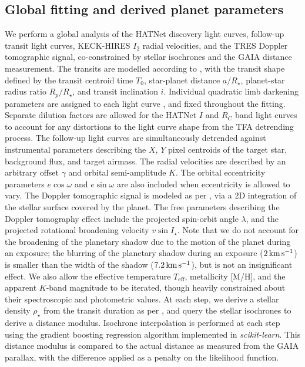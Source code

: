 \documentclass[apjl]{emulateapj}
\newcommand{\kms}{\ensuremath{\rm km\,s^{-1}}}
\begin{document}
\subsection{Global fitting and derived planet parameters}
\label{sec:global-fit}

We perform a global analysis of the HATNet discovery light curves, follow-up transit light curves, KECK-HIRES $I_2$ radial velocities, and the TRES Doppler tomographic signal, co-constrained by stellar isochrones and the GAIA distance measurement. The transits are modelled according to \citet{2002ApJ...580L.171M}, with the transit shape defined by the transit centroid time $T_0$, star-planet distance $a/R_\star$, planet-star radius ratio $R_p/R_\star$, and transit inclination $i$. Individual quadratic limb darkening parameters are assigned to each light curve \citep[interpolated from][]{Claret:2011}, and fixed throughout the fitting. Separate dilution factors are allowed for the HATNet $I$ and $R_C$ band light curves to account for any distortions to the light curve shape from the TFA detrending process. The follow-up light curves are simultaneously detrended against instrumental parameters describing the $X$, $Y$ pixel centroids of the target star, background flux, and target airmass. The radial velocities are described by an arbitrary offset $\gamma$ and orbital semi-amplitude $K$. The orbital eccentricity parameters $e\cos\omega$ and $e\sin\omega$ are also included when eccentricity is allowed to vary. The Doppler tomographic signal is modeled as per \citet{2016arXiv160703512Z}, via a 2D integration of the stellar surface covered by the planet. The free parameters describing the Doppler tomography effect include the projected spin-orbit angle $\lambda$, and the projected rotational broadening velocity $v\sin I_\star$. Note that we do not account for the broadening of the planetary shadow due to the motion of the planet during an exposure; the blurring of the planetary shadow during an exposure ($2\,\kms$) is smaller than the width of the shadow ($7.2\,\kms$), but is not an  insignificant effect. We also allow the effective temperature $T_\mathrm{eff}$, metallicity [M/H], and the apparent $K$-band magnitude to be iterated, though heavily constrained about their spectroscopic and photometric values. At each step, we derive a stellar density $\rho_\star$ from the transit duration as per \citet{Seager:2003,Sozzetti:2007}, and query the stellar isochrones to derive a distance modulus. Isochrone interpolation is performed at each step using the gradient boosting regression algorithm implemented in \emph{scikit-learn}. This distance modulus is compared to the actual distance as measured from the GAIA parallax, with the difference applied as a penalty on the likelihood function. 
\end{document}

